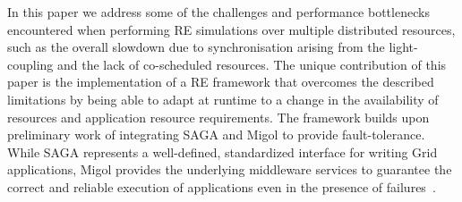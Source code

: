 \documentclass{rspublic}
\begin{document}





In this paper we address some of the challenges and performance
bottlenecks encountered when performing RE simulations over multiple
distributed resources, such as the overall slowdown due to
synchronisation arising from the light-coupling and the lack of
co-scheduled resources.  The unique contribution of this paper is the
implementation of a RE framework that overcomes the described
limitations by being able to adapt at runtime to a change in the
availability of resources and application resource requirements.  The
framework builds upon preliminary work of integrating SAGA and Migol to
provide fault-tolerance.
While SAGA represents a well-defined, standardized interface for writing
Grid applications, Migol provides the underlying middleware services
to guarantee the correct and reliable exe\-cution of applications even
in the presence of failures~\citep{Luckow:2008la}.
\end{document}
